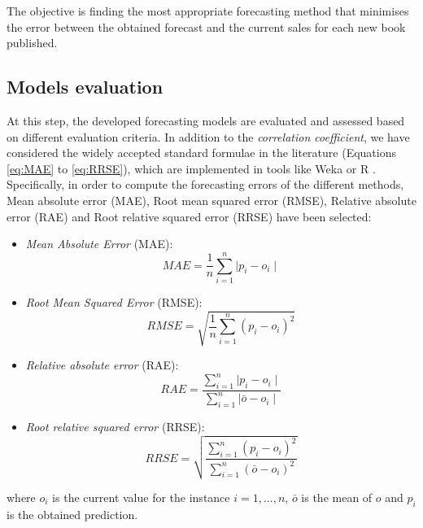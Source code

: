\documentclass[a4paper,10pt,twocolumn,preprint,3p]{elsarticle}
\begin{document}
\begin{itemize}
\end{itemize}

The objective is finding the most appropriate forecasting method that minimises 
the error between the obtained forecast and the current sales for each new book 
published.

\subsection{Models evaluation}
\label{subsec:models_evaluation}

At this step, the developed forecasting models are evaluated and assessed based on different evaluation criteria. In addition to the \textit{correlation coefficient}, we have considered the widely accepted standard formulae in the literature \cite{gepsoft} (Equations \ref{eq:MAE} to \ref{eq:RRSE}), which are implemented in tools like Weka \cite{pentaho,Witten2011} or R \cite{otexts,Hyndman2013}.
Specifically, in order to compute the forecasting errors of the different methods, Mean absolute error (MAE), Root mean squared error (RMSE), Relative absolute error (RAE) and Root relative squared error (RRSE) have been selected:

\begin{itemize}
  \item \emph{Mean Absolute Error} (MAE):
        \begin{equation}\label{eq:MAE}
            MAE = \frac{1}{n}\sum_{i=1}^n {\mid p_i - o_i\mid}
        \end{equation}

  \item \emph{Root Mean Squared Error} (RMSE):
        \begin{equation}\label{eq:RMSE}
            RMSE = \sqrt{ \frac{1}{n}\sum_{i=1}^n {(p_i - o_i)}^2 }
        \end{equation}

  \item \emph{Relative absolute error} (RAE):
        \begin{equation}\label{eq:RAE}
            RAE = \frac{ \sum_{i=1}^n {\mid p_i - o_i\mid} }{ \sum_{i=1}^n {\mid \bar{o} - o_i\mid} }
        \end{equation}

  \item \emph{Root relative squared error} (RRSE):
        \begin{equation}\label{eq:RRSE}
            RRSE = \sqrt{ \frac{ \sum_{i=1}^n {(p_i - o_i)}^2  }{ \sum_{i=1}^n {(\bar{o} - o_i)}^2 }  }
        \end{equation}
\end{itemize}
where $o_i$ is the current value for the instance $i = {1,...,n}$, $\bar{o}$ is the mean of $o$ and $p_i$ is the obtained prediction.
\end{document}
